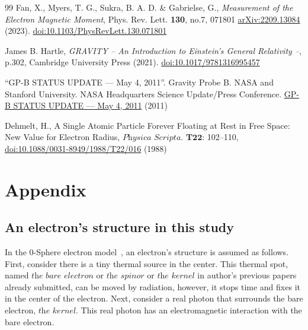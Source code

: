 \documentclass[%
 reprint,
 amsmath,amssymb,
 aps,
]{revtex4-1}
\numberwithin{equation}{section}%
\begin{document}
\begin{thebibliography}{99}
Fan, X., Myers, T. G., Sukra, B. A. D. \& Gabrielse, G.,
\textit{Measurement of the Electron Magnetic Moment},
Phys. Rev. Lett. \textbf{130}, no.7, 071801 \href{https://arxiv.org/abs/2209.13084}{arXiv:2209.13084} (2023).
\href{https://doi.org/10.1103/PhysRevLett.130.071801}{doi:10.1103/PhysRevLett.130.071801}

James B. Hartle,
\textit{GRAVITY -- An Introduction to Einstein's General Relativity --}, p.302,
Cambridge University Press (2021).
\href{https://doi.org/10.1017/9781316995457}{doi:10.1017/9781316995457}

``GP-B STATUS UPDATE — May 4, 2011''. Gravity Probe B. NASA and Stanford University. NASA Headquarters Science Update/Press Conference. \href{http://einstein.stanford.edu/highlights/status1.html}{GP-B STATUS UPDATE — May 4, 2011} (2011)

Dehmelt, H.,
A Single Atomic Particle Forever Floating at Rest in Free Space: New Value for Electron Radius,
$\textit{Physica Scripta}$. $\textbf{T22}$: 102--110,
\href{https://iopscience.iop.org/article/10.1088/0031-8949/1988/T22/016}{doi:10.1088/0031-8949/1988/T22/016} (1988)

\end{thebibliography}


\section{\label{sec:Appendix}Appendix}

\subsection{\label{sec:An electron's structure}An electron’s structure in this study}

In the 0-Sphere electron model~\cite{hanamura2018}, an electron's structure is assumed as follows. First, consider there is a tiny thermal source in the center. This thermal spot, named $\textit{the bare electron}$ or $\textit{the spinor}$ or $\textit{the kernel}$ in author's previous papers already submitted, can be moved by radiation, however, it stops time and fixes it in the center of the electron. Next, consider a real photon that surrounds the bare electron, $\textit{the kernel}$. This real photon has an electromagnetic interaction with the bare electron.
\end{document}

